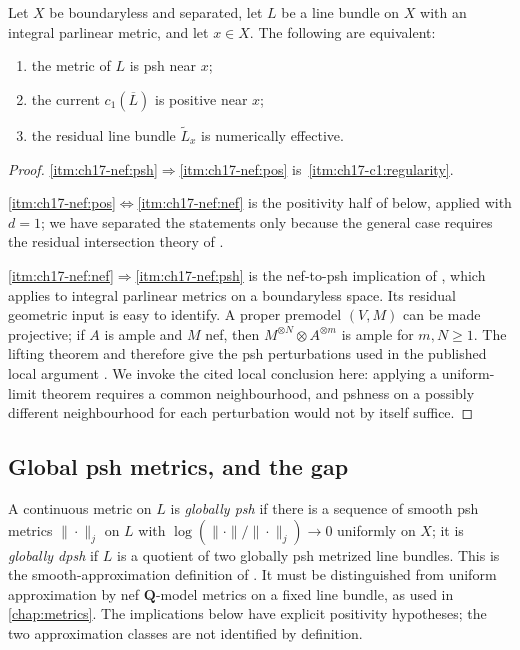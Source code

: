 \begin{theorem}
\label{thm:ch17-psh-residual-nef}
Let $X$ be boundaryless and separated, let $L$ be a line bundle on $X$
with an integral parlinear metric, and let $x\in X$.  The following are
equivalent:
\begin{enumerate}
\item\label{itm:ch17-nef:psh} the metric of $L$ is psh near $x$;
\item\label{itm:ch17-nef:pos} the current $c_1(\overline L)$ is positive
 near $x$;
\item\label{itm:ch17-nef:nef} the residual line bundle $\widetilde L_x$
 is numerically effective.
\end{enumerate}
\end{theorem}

\begin{proof}
\cref{itm:ch17-nef:psh}$\Rightarrow$\cref{itm:ch17-nef:pos} is
\,\cref{itm:ch17-c1:regularity}.

\cref{itm:ch17-nef:pos}$\Leftrightarrow$\cref{itm:ch17-nef:nef} is the
positivity half of  below, applied with
$d=1$; we have separated the statements only because the general case
requires the residual intersection theory of .

\cref{itm:ch17-nef:nef}$\Rightarrow$\cref{itm:ch17-nef:psh} is the
nef-to-psh implication of \cite[Corollary~18.8.8]{CLD25}, which applies
to integral parlinear metrics on a boundaryless space.  Its residual
geometric input is easy to identify.  A proper premodel $(V,M)$ can be
made projective; if $A$ is ample and $M$ nef, then
$M^{\otimes N}\otimes A^{\otimes m}$ is ample for $m,N\ge1$.
The lifting theorem and 
therefore give the psh perturbations used in the published local
argument \cite[Proposition~17.8.4]{CLD25}.  We invoke the cited local
conclusion here: applying a uniform-limit theorem requires a common
neighbourhood, and pshness on a possibly different neighbourhood for
each perturbation would not by itself suffice.
\end{proof}

\subsection{Global psh metrics, and the gap}
\label{sec:ch17-global-psh}

A continuous metric on $L$ is \emph{globally psh} if there is a sequence
of smooth psh metrics $\|\cdot\|_j$ on $L$ with
$\log(\|\cdot\|/\|\cdot\|_j)\to0$ uniformly on $X$; it is
\emph{globally dpsh} if $L$ is a quotient of two globally psh metrized
line bundles.  This is the smooth-approximation definition of
\cite[\S17.8.5]{CLD25}.  It must be distinguished from uniform
approximation by nef $\mathbf Q$-model metrics on a fixed line bundle,
as used in \cref{chap:metrics}.  The implications below have explicit
positivity hypotheses; the two approximation classes are not identified
by definition.

